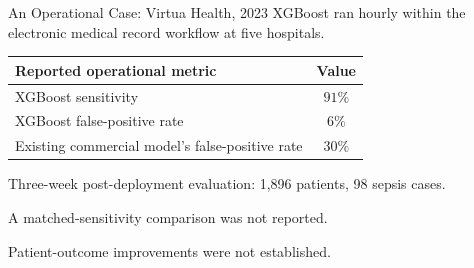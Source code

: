 \begin{frame}{An Operational Case: Virtua Health, 2023}
  XGBoost ran hourly within the electronic medical record workflow at five hospitals.
  \vspace{.3cm}
  \centering
  \renewcommand{\arraystretch}{1.4}
  \begin{tabular}{lc}
    \toprule
    Reported operational metric & Value\\ \midrule
    XGBoost sensitivity & $91\%$\\
    XGBoost false-positive rate & $6\%$\\
    Existing commercial model's false-positive rate & $30\%$\\ \bottomrule
  \end{tabular}
  \vspace{.2cm}
  \par Three-week post-deployment evaluation: 1,896 patients, 98 sepsis cases.
  \vspace{.3cm}
  \par A matched-sensitivity comparison was not reported.\par
  Patient-outcome improvements were not established.
\end{frame}
